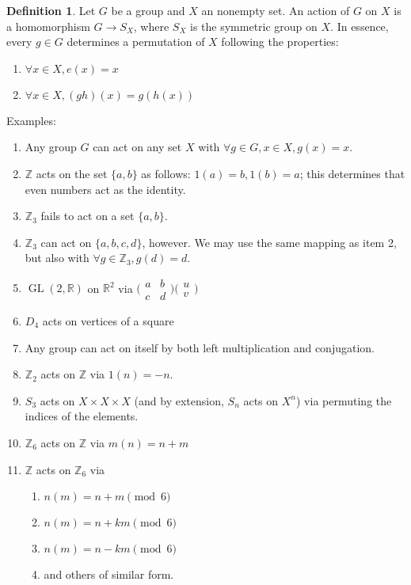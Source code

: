 \documentclass{article}
\theoremstyle{definition}
\newtheorem{definition}{Definition}
\theoremstyle{plain}
\theoremstyle{corollary}
\theoremstyle{lemma}
\DeclareMathOperator{\GL}{GL}
\begin{document}
\begin{definition}
Let $G$ be a group and $X$ an nonempty set. An action of $G$ on $X$ is a homomorphism $G\rightarrow S_X$, where $S_X$ is the symmetric group on $X$.
In essence, every $g\in G$ determines a permutation of $X$ following the properties:
\begin{enumerate}
    \item $\forall x\in X,e(x)=x$
    \item $\forall x\in X,(gh)(x)=g(h(x))$
\end{enumerate}
\end{definition}

Examples:
\begin{enumerate}
    \item Any group $G$ can act on any set $X$ with $\forall g\in G,x\in X,g(x)=x$.
    \item $\mathbb{Z}$ acts on the set $\{a,b\}$ as follows: $1(a)=b,1(b)=a$; this determines that even numbers act as the identity.
    \item $\mathbb{Z}_3$ fails to act on a set $\{a,b\}$.
    \item $\mathbb{Z}_3$ can act on $\{a,b,c,d\}$, however. We may use the same mapping as item 2, but also with $\forall g\in\mathbb{Z}_3,g(d)=d$.
    \item $\GL(2,\mathbb{R})$ on $\mathbb R^2$ via $\bigl(
        \begin{smallmatrix}
            a & b \\
            c & d
        \end{smallmatrix}\bigr)
        \bigl(\begin{smallmatrix}
            u \\
            v
        \end{smallmatrix}\bigr)$
    \item $D_4$ acts on vertices of a square
    \item Any group can act on itself by both left multiplication and conjugation.
    \item $\mathbb{Z}_2$ acts on $\mathbb{Z}$ via $1(n)=-n$.
    \item $S_3$ acts on $X\times X\times X$ (and by extension, $S_n$ acts on $X^n$) via permuting the indices of the elements.
    \item $\mathbb{Z}_6$ acts on $\mathbb{Z}$ via $m(n)=n+m$
    \item $\mathbb{Z}$ acts on $\mathbb{Z}_6$ via \begin{enumerate}
        \item $n(m)=n+m\pmod6$
        \item $n(m)=n+km\pmod6$
        \item $n(m)=n-km\pmod6$
        \item and others of similar form.
    \end{enumerate}
\end{enumerate}
\end{document}
